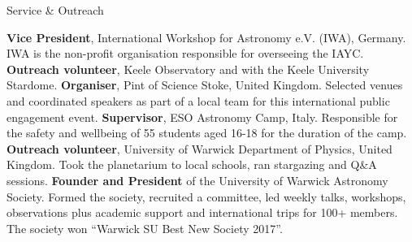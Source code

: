 \begin{rubric}{Service \& Outreach}

%
    \textbf{Vice President}, International Workshop for Astronomy e.V. (IWA), Germany. IWA is the non-profit organisation responsible for overseeing the IAYC.
%
    \textbf{Outreach volunteer}, Keele Observatory and with the Keele University Stardome. 
\entry*[2019 -- 2020]%
    \textbf{Organiser}, Pint of Science Stoke, United Kingdom. Selected venues and coordinated speakers as part of a local team for this international public engagement event.
\entry*[2017 -- 2019]%
    \textbf{Supervisor}, ESO Astronomy Camp, Italy. Responsible for the safety and wellbeing of 55 students aged 16-18 for the duration of the camp.%
\entry*[2017 -- 2018]%
    \textbf{Outreach volunteer}, University of Warwick Department of Physics, United Kingdom. Took the planetarium to local schools, ran stargazing and Q\&A sessions.
\entry*[2016 -- 2018]%
    \textbf{Founder and President} of the University of Warwick Astronomy Society. Formed the society, recruited a committee, led weekly talks, workshops, observations plus academic support and international trips for 100+ members. The society won “Warwick SU Best New Society 2017”.

\end{rubric}